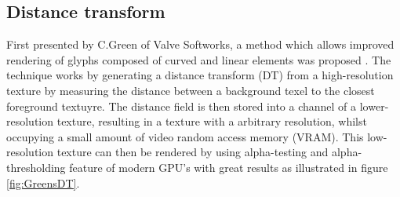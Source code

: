 \subsection{Distance transform}
First presented by C.Green of Valve Softworks, a method which allows improved rendering of glyphs composed of curved and linear elements was proposed \cite{green2007improved}. The technique works by generating a distance transform (DT) from a high-resolution texture by measuring the distance between a background texel to the closest foreground textuyre. The distance field is then stored into a channel of a lower-resolution texture, resulting in a texture with a arbitrary resolution, whilst occupying a small amount of video random access memory (VRAM). This low-resolution texture can then be rendered by using alpha-testing and alpha-thresholding feature of modern GPU's with great results as illustrated in figure \ref{fig:GreensDT}. 

